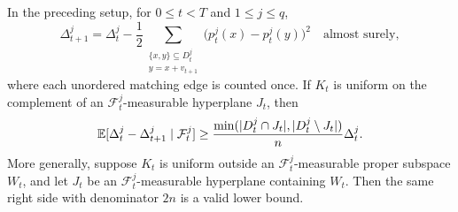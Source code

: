 \begin{lemma}
\label{lem:marginal-averaging}\label{shear:lem:energy}
In the preceding setup, for $0\le t<T$ and $1\le j\le q$,
\begin{equation}\label{eq:marginal-exact-decrement}
 \Delta_{t+1}^j=\Delta_t^j-\frac12
 \sum_{\substack{\{x,y\}\subseteq D_t^j\\y=x+v_{t+1}}}
       \bigl(p_t^j(x)-p_t^j(y)\bigr)^2
 \quad\text{almost surely},
\end{equation}
where each unordered matching edge is counted once. If $K_t$ is
uniform on the complement of an $\mathcal F_t^j$-measurable
hyperplane $J_t$, then
\begin{equation}\label{eq:marginal-cross-energy}
 \mathbb E[\Delta_t^j-\Delta_{t+1}^j\mid\mathcal F_t^j]
 \ge
 \frac{\min(|D_t^j\cap J_t|,|D_t^j\setminus J_t|)}{n}\Delta_t^j.
\end{equation}
More generally, suppose $K_t$ is uniform outside an
$\mathcal F_t^j$-measurable proper subspace $W_t$, and let $J_t$
be an $\mathcal F_t^j$-measurable hyperplane containing $W_t$.
Then the same right side with denominator $2n$ is a valid lower
bound.
\end{lemma}
